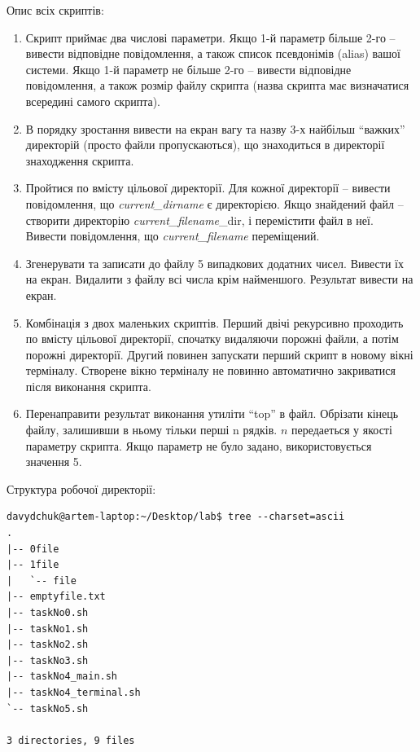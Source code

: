 \documentclass[12pt,a4paper]{article}
\begin{document}
    Опис всіх скриптів:

    \begin{enumerate}[label=\arabic*., start=0, itemsep=0.6em, leftmargin=*, align=left]

\item Скрипт приймає два числові параметри.
Якщо 1-й параметр більше 2-го -- вивести відповідне повідомлення, а
також список псевдонімів (alias) вашої системи.
Якщо 1-й параметр не більше 2-го -- вивести відповідне
повідомлення, а також розмір файлу скрипта (назва скрипта має
визначатися всередині самого скрипта).

\item В порядку зростання вивести на екран вагу та назву 3-х найбільш
“важких” директорій (просто файли пропускаються), що знаходиться
в директорії знаходження скрипта.

\item Пройтися по вмісту цільової директорії.
Для кожної директорії -- вивести повідомлення, що \emph{current\_dirname}
є директорією.
Якщо знайдений файл -- створити директорію \emph{current\_filename}\_dir,
і перемістити файл в неї. Вивести повідомлення, що
\emph{current\_filename} переміщений.

\item Згенерувати та записати до файлу 5 випадкових додатних чисел.
Вивести їх на екран. Видалити з файлу всі числа крім найменшого.
Результат вивести на екран.

\item Комбінація з двох маленьких скриптів.
Перший двічі рекурсивно проходить по вмісту цільової директорії,
спочатку видаляючи порожні файли, а потім порожні директорії.
Другий повинен запускати перший скрипт в новому вікні терміналу.
Створене вікно терміналу не повинно автоматично закриватися після
виконання скрипта.

\item Перенаправити результат виконання утиліти “top” в файл.
Обрізати кінець файлу, залишивши в ньому тільки перші n рядків. $n$
передаеться у якості параметру скрипта. Якщо параметр не було
задано, використовується значення 5.

\end{enumerate}

    Структура робочої директорії:

    \begin{verbatim}
davydchuk@artem-laptop:~/Desktop/lab$ tree --charset=ascii
.
|-- 0file
|-- 1file
|   `-- file
|-- emptyfile.txt
|-- taskNo0.sh
|-- taskNo1.sh
|-- taskNo2.sh
|-- taskNo3.sh
|-- taskNo4_main.sh
|-- taskNo4_terminal.sh
`-- taskNo5.sh

3 directories, 9 files
    \end{verbatim}
\end{document}
